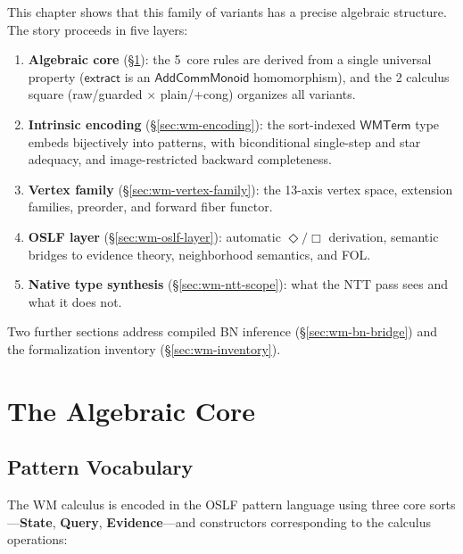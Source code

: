 \documentclass[11pt,openany]{report}
\begin{document}
This chapter shows that this family of variants has a precise algebraic
structure.  The story proceeds in five layers:
\begin{enumerate}
\item \textbf{Algebraic core} (\S\ref{sec:wm-algebraic-core}): the 5~core
  rules are derived from a single universal property ($\mathsf{extract}$ is
  an $\mathsf{AddCommMonoid}$ homomorphism), and the 2 calculus
  square (raw/guarded $\times$ plain/+cong) organizes all variants.
\item \textbf{Intrinsic encoding} (\S\ref{sec:wm-encoding}): the
  sort-indexed $\mathsf{WMTerm}$ type embeds bijectively into patterns, with
  biconditional single-step and star adequacy, and image-restricted backward
  completeness.
\item \textbf{Vertex family} (\S\ref{sec:wm-vertex-family}): the 13-axis
  vertex space, extension families, preorder, and forward fiber functor.
\item \textbf{OSLF layer} (\S\ref{sec:wm-oslf-layer}): automatic
  $\Diamond/\Box$ derivation, semantic bridges to evidence theory,
  neighborhood semantics, and FOL.
\item \textbf{Native type synthesis} (\S\ref{sec:wm-ntt-scope}): what the
  NTT pass sees and what it does not.
\end{enumerate}
Two further sections address compiled BN inference
(\S\ref{sec:wm-bn-bridge}) and the formalization inventory
(\S\ref{sec:wm-inventory}).

\section{The Algebraic Core}
\label{sec:wm-algebraic-core}

\subsection{Pattern Vocabulary}

The WM calculus is encoded in the OSLF pattern language using three core
sorts---\textbf{State}, \textbf{Query}, \textbf{Evidence}---and
constructors corresponding to the calculus operations:
\end{document}
